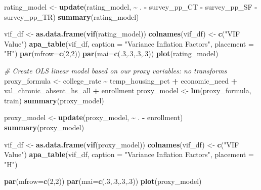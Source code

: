 \documentclass[
  man,floatsintext]{apa6}
\newenvironment{Shaded}{\begin{snugshade}}{\end{snugshade}}
\newcommand{\AttributeTok}[1]{\textcolor[rgb]{0.13,0.29,0.53}{#1}}
\newcommand{\CommentTok}[1]{\textcolor[rgb]{0.56,0.35,0.01}{\textit{#1}}}
\newcommand{\DecValTok}[1]{\textcolor[rgb]{0.00,0.00,0.81}{#1}}
\newcommand{\FunctionTok}[1]{\textcolor[rgb]{0.13,0.29,0.53}{\textbf{#1}}}
\newcommand{\NormalTok}[1]{#1}
\newcommand{\OtherTok}[1]{\textcolor[rgb]{0.56,0.35,0.01}{#1}}
\newcommand{\SpecialCharTok}[1]{\textcolor[rgb]{0.81,0.36,0.00}{\textbf{#1}}}
\newcommand{\StringTok}[1]{\textcolor[rgb]{0.31,0.60,0.02}{#1}}
\begin{document}
\begin{Shaded}
\begin{Highlighting}[]
\NormalTok{rating\_model }\OtherTok{\textless{}{-}} \FunctionTok{update}\NormalTok{(rating\_model, }\SpecialCharTok{\textasciitilde{}}\NormalTok{ . }\SpecialCharTok{{-}}\NormalTok{ survey\_pp\_CT }\SpecialCharTok{{-}}\NormalTok{ survey\_pp\_SF }\SpecialCharTok{{-}}\NormalTok{ survey\_pp\_TR)}
\FunctionTok{summary}\NormalTok{(rating\_model)}

\NormalTok{vif\_df }\OtherTok{\textless{}{-}} \FunctionTok{as.data.frame}\NormalTok{(}\FunctionTok{vif}\NormalTok{(rating\_model))}
\FunctionTok{colnames}\NormalTok{(vif\_df) }\OtherTok{\textless{}{-}} \FunctionTok{c}\NormalTok{(}\StringTok{"VIF Value"}\NormalTok{)}
\FunctionTok{apa\_table}\NormalTok{(vif\_df, }\AttributeTok{caption =} \StringTok{"Variance Inflation Factors"}\NormalTok{, }\AttributeTok{placement =} \StringTok{"H"}\NormalTok{)}
\FunctionTok{par}\NormalTok{(}\AttributeTok{mfrow=}\FunctionTok{c}\NormalTok{(}\DecValTok{2}\NormalTok{,}\DecValTok{2}\NormalTok{))}
\FunctionTok{par}\NormalTok{(}\AttributeTok{mai=}\FunctionTok{c}\NormalTok{(.}\DecValTok{3}\NormalTok{,.}\DecValTok{3}\NormalTok{,.}\DecValTok{3}\NormalTok{,.}\DecValTok{3}\NormalTok{))}
\FunctionTok{plot}\NormalTok{(rating\_model)}

\CommentTok{\# Create OLS linear model based on our proxy variables: no transforms}
\NormalTok{proxy\_formula }\OtherTok{\textless{}{-}}\NormalTok{ college\_rate }\SpecialCharTok{\textasciitilde{}}\NormalTok{ temp\_housing\_pct }\SpecialCharTok{+}\NormalTok{ economic\_need }\SpecialCharTok{+}\NormalTok{ val\_chronic\_absent\_hs\_all }\SpecialCharTok{+}\NormalTok{ enrollment}
\NormalTok{proxy\_model }\OtherTok{\textless{}{-}} \FunctionTok{lm}\NormalTok{(proxy\_formula, train)}
\FunctionTok{summary}\NormalTok{(proxy\_model)}

\NormalTok{proxy\_model }\OtherTok{\textless{}{-}} \FunctionTok{update}\NormalTok{(proxy\_model, }\SpecialCharTok{\textasciitilde{}}\NormalTok{ . }\SpecialCharTok{{-}}\NormalTok{ enrollment)}
\FunctionTok{summary}\NormalTok{(proxy\_model)}

\NormalTok{vif\_df }\OtherTok{\textless{}{-}} \FunctionTok{as.data.frame}\NormalTok{(}\FunctionTok{vif}\NormalTok{(proxy\_model))}
\FunctionTok{colnames}\NormalTok{(vif\_df) }\OtherTok{\textless{}{-}} \FunctionTok{c}\NormalTok{(}\StringTok{"VIF Value"}\NormalTok{)}
\FunctionTok{apa\_table}\NormalTok{(vif\_df, }\AttributeTok{caption =} \StringTok{"Variance Inflation Factors"}\NormalTok{, }\AttributeTok{placement =} \StringTok{"H"}\NormalTok{)}

\FunctionTok{par}\NormalTok{(}\AttributeTok{mfrow=}\FunctionTok{c}\NormalTok{(}\DecValTok{2}\NormalTok{,}\DecValTok{2}\NormalTok{))}
\FunctionTok{par}\NormalTok{(}\AttributeTok{mai=}\FunctionTok{c}\NormalTok{(.}\DecValTok{3}\NormalTok{,.}\DecValTok{3}\NormalTok{,.}\DecValTok{3}\NormalTok{,.}\DecValTok{3}\NormalTok{))}
\FunctionTok{plot}\NormalTok{(proxy\_model)}


\end{Highlighting}
\end{Shaded}
\end{document}
